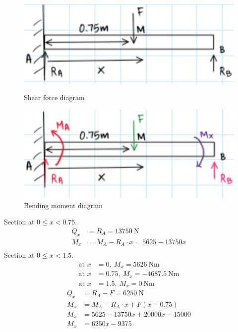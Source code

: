 \documentclass[11pt]{article}
\numberwithin{equation}{section}
\begin{document}
\begin{figure}[H]
  \centering
  \begin{minipage}[b]{0.49\textwidth}
    \includegraphics[width=\textwidth]{./img/Q2Sketch.png}
    \caption{Shear force diagram}
  \end{minipage}
  \hfill
  \begin{minipage}[b]{0.49\textwidth}
    \includegraphics[width=\textwidth]{./img/Q2Sketch2.png}
    \caption{Bending moment diagram}
  \end{minipage}
\end{figure}
Section at $0 \leq x < 0.75$.
\begin{align}
  Q_x &= R_A = \SI{13750}{\newton}\\
  M_x &= M_A - R_A \cdot x = 5625 - 13750 x\\
\end{align}
Section at $0 \leq x < 1.5$.
\begin{align}
  \textrm{at } x &= 0, \ M_x = \SI{5626}{\newton\metre}\\
  \textrm{at } x &= 0.75, \ M_x = \SI{-4687.5}{\newton\metre}\\
  \textrm{at } x &= 1.5, \ M_x = \SI{0}{\newton\metre}
\end{align}
\begin{align}
  Q_x &= R_A - F = \SI{6250}{\newton}\\
  M_x &= M_A - R_A \cdot x + F(x - 0.75)\\
  M_x &= 5625 -13750x + 20000x - 15000\\
  M_x &= 6250x - 9375
\end{align}
\end{document}
